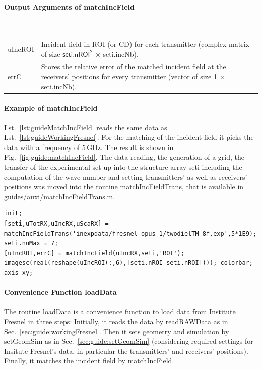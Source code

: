\documentclass[a4paper]{article}
\begin{document}
\paragraph{Output Arguments of \textsf{matchIncField}}\hfill\\
\noindent\begin{tabular}[t]{p{2cm} p{13.6cm}}
 \textsf{uIncROI} & Incident field in ROI (or CD) for each transmitter (complex matrix of size $\textsf{seti.nROI}^2$ $\times$ \textsf{seti.incNb}).\\
 \textsf{errC} & Stores the relative error of the matched incident field at the receivers' positions for every transmitter (vector of size 1 $\times$ \textsf{seti.incNb}).
\end{tabular}

\paragraph{Example of \textsf{matchIncField}} Lst.~\ref{lst:guideMatchIncField} reads the same data as Lst.~\ref{lst:guideWorkingFresnel}. For the matching of the incident field it picks the data with a frequency of 5\,GHz. The result is shown in Fig.~\ref{fig:guide:matchIncField}. The data reading, the generation of a grid, the transfer of the experimental set-up into the structure array \textsf{seti} including the computation of the wave number and setting transmitters' as well as receivers' positions was moved into the routine \textsf{matchIncFieldTrans}, that is available in \textsf{guides/\allowbreak auxi/\allowbreak matchIncFieldTrans.m}.

\begin{lstlisting}[caption={Matching the incident field (\emph{source code}: \textsf{guides/guideMatchIncField.m}).},label=lst:guideMatchIncField]
init;
[seti,uTotRX,uIncRX,uScaRX] = matchIncFieldTrans('inexpdata/fresnel_opus_1/twodielTM_8f.exp',5*1E9);
seti.nuMax = 7;
[uIncROI,errC] = matchIncField(uIncRX,seti,'ROI');
imagesc(real(reshape(uIncROI(:,6),[seti.nROI seti.nROI]))); colorbar; axis xy;
\end{lstlisting}

\paragraph{Convenience Function \textsf{loadData}} The routine \textsf{loadData} is a convenience function to load data from Institute Fresnel in three steps: Initially, it reads the data by \textsf{readRAWData} as in Sec.~\ref{sec:guide:workingFresnel}. Then it sets geometry and simulation by \textsf{setGeomSim} as in Sec.~\ref{sec:guide:setGeomSim} (considering required settings for Insitute Fresnel's data, in particular the transmitters' and receivers' positions). Finally, it matches the incident field by \textsf{matchIncField}.
\end{document}
